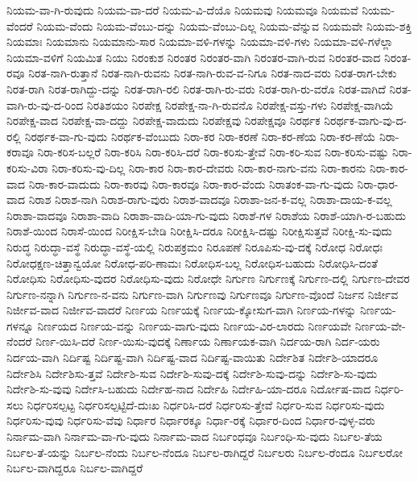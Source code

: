 {ನಿಯಮ-ವಾ-ಗಿ-ರುವುದು
ನಿಯಮ-ವಾ-ದರೆ
ನಿಯಮ-ವಿ-ದೆಯೊ
ನಿಯಮವು
ನಿಯಮವೂ
ನಿಯಮವೆ
ನಿಯಮ-ವೆಂದರೆ
ನಿಯಮ-ವೆಂದು
ನಿಯಮ-ವೆಂಬು-ದನ್ನು
ನಿಯಮ-ವೆಂಬು-ದಿಲ್ಲ
ನಿಯಮ-ವೆನ್ನುವ
ನಿಯಮವೇ
ನಿಯಮ-ಶಕ್ತಿ
ನಿಯಮಾಃ
ನಿಯಮಾನು
ನಿಯಮಾನು-ಸಾರ
ನಿಯಮಾ-ವಳಿ-ಗಳನ್ನು
ನಿಯಮಾ-ವಳಿ-ಗಳು
ನಿಯಮಾ-ವಳಿ-ಗಳೆಲ್ಲಾ
ನಿಯಮಾ-ವಳಿಗೆ
ನಿಯಮಿತ
ನಿಯು
ನಿರಂಕುಶ
ನಿರಂತರ
ನಿರಂತರ-ವಾಗಿ
ನಿರಂತರ-ವಾಗಿ-ರುವ
ನಿರಂತರ-ವಾದ
ನಿರಂತ-ರವೂ
ನಿರತ-ನಾಗಿ-ರುತ್ತಾನೆ
ನಿರತ-ನಾಗಿ-ರುವನು
ನಿರತ-ನಾಗಿ-ರುವ-ವ-ನಿಗೂ
ನಿರತ-ನಾದ-ವರು
ನಿರತ-ರಾಗ-ಬೇಕು
ನಿರತ-ರಾಗಿ
ನಿರತ-ರಾಗಿದ್ದು-ದನ್ನು
ನಿರತ-ರಾಗಿ-ರಲಿ
ನಿರತ-ರಾಗಿ-ರು-ವರು
ನಿರತ-ರಾಗಿ-ರು-ವರೊ
ನಿರತ-ವಾಗಿದೆ
ನಿರತ-ವಾಗಿ-ರು-ವು-ದ-ರಿಂದ
ನಿರತಿಶಯಂ
ನಿರಪೇಕ್ಷ
ನಿರಪೇಕ್ಷ-ನಾ-ಗಿ-ರುವನೊ
ನಿರಪೇಕ್ಷ-ವಸ್ತು-ಗಳು
ನಿರಪೇಕ್ಷ-ವಾಗಿಯೆ
ನಿರಪೇಕ್ಷ-ವಾದ
ನಿರಪೇಕ್ಷ-ವಾ-ದದ್ದು
ನಿರಪೇಕ್ಷ-ವಾದುದು
ನಿರಪೇಕ್ಷವು
ನಿರಪೇಕ್ಷವೂ
ನಿರರ್ಥಕ
ನಿರರ್ಥಕ-ವಾಗು-ವು-ದ-ರಲ್ಲಿ
ನಿರರ್ಥಕ-ವಾ-ಗು-ವುದು
ನಿರರ್ಥಕ-ವೆಂಬುದು
ನಿರಾ-ಕರ
ನಿರಾ-ಕರಣೆ
ನಿರಾ-ಕರ-ಣೆಯ
ನಿರಾ-ಕರ-ಣೆಯೆ
ನಿರಾ-ಕರಾವೂ
ನಿರಾ-ಕರಿಸ-ಬಲ್ಲರೆ
ನಿರಾ-ಕರಿಸಿ
ನಿರಾ-ಕರಿಸಿ-ದರೆ
ನಿರಾ-ಕರಿಸು-ತ್ತೇವೆ
ನಿರಾ-ಕರಿ-ಸುವ
ನಿರಾ-ಕರಿಸು-ವಷ್ಟು
ನಿರಾ-ಕರಿಸು-ವಿರಾ
ನಿರಾ-ಕರಿಸು-ವು-ದಿಲ್ಲ
ನಿರಾ-ಕಾರ
ನಿರಾ-ಕಾರ-ದೇವರು
ನಿರಾ-ಕಾರ-ನಾಗು-ವನು
ನಿರಾ-ಕಾರನು
ನಿರಾ-ಕಾರ-ವಾದ
ನಿರಾ-ಕಾರ-ವಾದುದು
ನಿರಾ-ಕಾರವು
ನಿರಾ-ಕಾರವೂ
ನಿರಾ-ಕಾರ-ವೆಂದು
ನಿರಾತಂಕ-ವಾ-ಗು-ವುದು
ನಿರಾ-ಧಾರ-ವಾದ
ನಿರಾಶ
ನಿರಾಶ-ನಾಗಿ
ನಿರಾಶ-ರಾಗು-ವುರು
ನಿರಾಶ-ವಾದವೂ
ನಿರಾಶಾ-ಜನ-ಕ-ವಲ್ಲ
ನಿರಾಶಾ-ದಾಯ-ಕ-ವಲ್ಲ
ನಿರಾಶಾ-ವಾದವೂ
ನಿರಾಶಾ-ವಾದಿ
ನಿರಾಶಾ-ವಾದಿ-ಯಾ-ಗು-ವುದು
ನಿರಾಶೆ-ಗಳ
ನಿರಾಶೆಯ
ನಿರಾಶೆ-ಯಾಗಿ-ರ-ಬಹುದು
ನಿರಾಶೆ-ಯಿಂದ
ನಿರಾಸೆ-ಯಿಂದ
ನಿರೀಕ್ಷಿಸ-ಬೇಡಿ
ನಿರೀಕ್ಷಿಸಿ-ದರೂ
ನಿರೀಕ್ಷಿಸಿ-ದಷ್ಟು
ನಿರೀಕ್ಷಿಸುತ್ತವೆ
ನಿರೀಕ್ಷಿ-ಸು-ವುದು
ನಿರುದ್ಧ
ನಿರುದ್ಧಾ-ವಸ್ಥೆ
ನಿರುದ್ಧಾ-ವಸ್ಥೆ-ಯಲ್ಲಿ
ನಿರುಪಕ್ರಮಂ
ನಿರೂಪಣೆ
ನಿರೂಪಿಸು-ವು-ದಕ್ಕೆ
ನಿರೋಧ
ನಿರೋಧಃ
ನಿರೋಧಕ್ಷಣ-ಚಿತ್ತಾನ್ವಯೋ
ನಿರೋಧ-ಪರಿ-ಣಾಮಃ
ನಿರೋಧಿಸ-ಬಲ್ಲ
ನಿರೋಧಿಸ-ಬಹುದು
ನಿರೋಧಿಸಿ-ದಂತೆ
ನಿರೋಧಿಸು
ನಿರೋಧಿಸು-ವುದರ
ನಿರೋಧಿಸು-ವುದು
ನಿರೋಧೇ
ನಿರ್ಗುಣ
ನಿರ್ಗುಣಕ್ಕೆ
ನಿರ್ಗುಣ-ದಲ್ಲಿ
ನಿರ್ಗುಣ-ದೇವರ
ನಿರ್ಗುಣ-ನನ್ನಾಗಿ
ನಿರ್ಗುಣ-ನ-ವನು
ನಿರ್ಗುಣ-ವಾಗಿ
ನಿರ್ಗುಣವು
ನಿರ್ಗುಣವೂ
ನಿರ್ಗುಣ-ವೊಂದೆ
ನಿರ್ಜನ
ನಿರ್ಜೀವ
ನಿರ್ಜೀವ-ವಾದ
ನಿರ್ಜೀವ-ವಾದರೆ
ನಿರ್ಣಯ
ನಿರ್ಣಯಕ್ಕೆ
ನಿರ್ಣಯ-ಕ್ಕೋಸುಗ-ವಾಗಿ
ನಿರ್ಣಯ-ಗಳನ್ನು
ನಿರ್ಣಯ-ಗಳನ್ನೂ
ನಿರ್ಣಯದ
ನಿರ್ಣಯ-ವನ್ನು
ನಿರ್ಣಯ-ವಾಗು-ವುದು
ನಿರ್ಣಯ-ವಿರ-ಲಾರದು
ನಿರ್ಣಯವೇ
ನಿರ್ಣಯ-ವೇ-ನೆಂದರೆ
ನಿರ್ಣ-ಯಿಸಿ-ದರೆ
ನಿರ್ಣ-ಯಿಸು-ವುದಕ್ಕೆ
ನಿರ್ಣಾಯ
ನಿರ್ಣಾಯಕ-ವಾಗಿ
ನಿರ್ದಯ-ರಾಗಿ
ನಿರ್ದ-ಯರು
ನಿರ್ದಯ-ವಾಗಿ
ನಿರ್ದಿಷ್ಟ
ನಿರ್ದಿಷ್ಟ-ವಾಗಿ
ನಿರ್ದಿಷ್ಟ-ವಾದ
ನಿರ್ದಿಷ್ಟ-ವಾಯಿತು
ನಿರ್ದೇಶಿತ
ನಿರ್ದೇಶಿ-ಯಾದರೂ
ನಿರ್ದೇಶಿಸಿ
ನಿರ್ದೇಶಿಸು-ತ್ತವೆ
ನಿರ್ದೇಶಿ-ಸುವ
ನಿರ್ದೇಶಿ-ಸುವು-ದಕ್ಕೆ
ನಿರ್ದೇಶಿ-ಸುವು-ದನ್ನು
ನಿರ್ದೇಶಿ-ಸು-ವುದು
ನಿರ್ದೇಶಿ-ಸು-ವುವು
ನಿರ್ದೇಸಿ-ಬಹುದು
ನಿರ್ದೇಹ-ನಾದ
ನಿರ್ದೇಹಿ
ನಿರ್ದೇಹಿ-ಯಾ-ದರೂ
ನಿರ್ದೋಷ-ವಾದ
ನಿರ್ಧರಿ-ಸಲು
ನಿರ್ಧರಿಸಲ್ಪಟ್ಟ
ನಿರ್ಧರಿಸಲ್ಪಟ್ಟಿದೆ-ದುಃಖ
ನಿರ್ಧರಿಸಿ-ದರೆ
ನಿರ್ಧರಿಸು-ತ್ತೇವೆ
ನಿರ್ಧರಿ-ಸುವ
ನಿರ್ಧರಿಸು-ವುದು
ನಿರ್ಧರಿಸು-ವುವು
ನಿರ್ಧರಿಸು-ವೆವು
ನಿರ್ಧಾರ
ನಿರ್ಧಾರಕ್ಕೂ
ನಿರ್ಧಾ-ರಕ್ಕೆ
ನಿರ್ಧಾರ-ದಿಂದ
ನಿರ್ಧಾರ-ವುಳ್ಳ-ವರು
ನಿರ್ನಾಮ-ವಾಗಿ
ನಿರ್ನಾಮ-ವಾ-ಗು-ವುದು
ನಿರ್ನಾಮ-ವಾದ
ನಿರ್ಬಂಧವೂ
ನಿರ್ಬಂಧಿ-ಸು-ವುದು
ನಿರ್ಬಲ-ತೆಯ
ನಿರ್ಬಲ-ತೆ-ಯನ್ನು
ನಿರ್ಬಲ-ನೆಂದು
ನಿರ್ಬಲ-ನೆಂದೂ
ನಿರ್ಬಲ-ರಾಗಿದ್ದರೆ
ನಿರ್ಬಲರು
ನಿರ್ಬಲ-ರೆಂದೂ
ನಿರ್ಬಲರೋ
ನಿರ್ಬಲ-ವಾಗಿದ್ದರೂ
ನಿರ್ಬಲ-ವಾಗಿದ್ದರೆ
}
